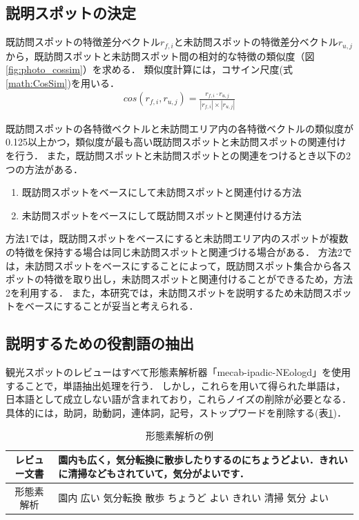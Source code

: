 \documentclass{deimj}
\begin{document}
\subsection{説明スポットの決定}
\label{subsec:説明スポットの決定}

既訪問スポットの特徴差分ベクトル$r_{f,i}$と未訪問スポットの特徴差分ベクトル$r_{u,j}$から，既訪問スポットと未訪問スポット間の相対的な特徴の類似度（図\ref{fig:photo_cossim}）を求める．
類似度計算には，コサイン尺度(式\ref{math:CosSim})を用いる．
\begin{eqnarray}
  cos(r_{f,i},r_{u,j})=\frac{r_{f,i} \cdot r_{u,j}}{|r_{f,i}| \times |r_{u,j}|}
  \label{math:CosSim}
\end{eqnarray}

既訪問スポットの各特徴ベクトルと未訪問エリア内の各特徴ベクトルの類似度が0.125以上かつ，類似度が最も高い既訪問スポットと未訪問スポットの関連付けを行う．
また，既訪問スポットと未訪問スポットとの関連をつけるとき以下の2つの方法がある．

\begin{enumerate}
  \item 既訪問スポットをベースにして未訪問スポットと関連付ける方法
  \item 未訪問スポットをベースにして既訪問スポットと関連付ける方法
\end{enumerate}

方法1では，既訪問スポットをベースにすると未訪問エリア内のスポットが複数の特徴を保持する場合は同じ未訪問スポットと関連づける場合がある．
方法2では，未訪問スポットをベースにすることによって，既訪問スポット集合から各スポットの特徴を取り出し，未訪問スポットと関連付けることができるため，方法2を利用する．
また，本研究では，未訪問スポットを説明するため未訪問スポットをベースにすることが妥当と考えられる．

\subsection{説明するための役割語の抽出}
\label{subsec:説明するための役割語の抽出}
観光スポットのレビューはすべて形態素解析器「mecab-ipadic-NEologd」を使用することで，単語抽出処理を行う．
しかし，これらを用いて得られた単語は，日本語として成立しない語が含まれており，これらノイズの削除が必要となる．
具体的には，助詞，助動詞，連体詞，記号，ストップワードを削除する(表\ref{table:mecab})．

\begin{table}[t]
  \caption{形態素解析の例}
  \label{table:mecab}
  \centering
    \begin{tabular}{c|p{}} \hline
      レビュー文書 & 園内も広く，気分転換に散歩したりするのにちょうどよい．きれいに清掃などもされていて，気分がよいです．\\
      \hline
      形態素解析 & 園内 広い 気分転換 散歩 ちょうど よい きれい 清掃 気分 よい\\
      \hline
    \end{tabular}
\end{table}
\end{document}
